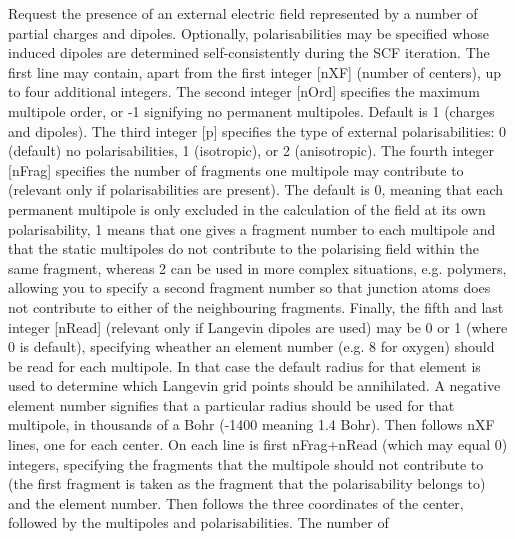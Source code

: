 \begin{keywordlist}
Request the presence of an external electric field represented by a
number of partial charges and dipoles. Optionally, polarisabilities may be specified whose
induced dipoles are determined self-consistently during the SCF iteration.
The first line may contain, apart from the first integer [nXF] (number of centers), up to
four additional integers. The second integer [nOrd] specifies the maximum multipole order,
or -1 signifying no permanent multipoles. Default is 1 (charges and dipoles). The third
integer [p] specifies the type of external polarisabilities: 0 (default) no polarisabilities,
1 (isotropic), or 2 (anisotropic). The fourth integer [nFrag] specifies the number of fragments one
multipole may contribute to (relevant only if polarisabilities are present). The default is 0,
meaning that each permanent multipole is only excluded in the calculation of the field at its own
polarisability, 1 means that one gives a fragment number to each multipole and that the static
multipoles do not contribute to the polarising field within the same fragment, whereas 2 can be
used in more complex situations, e.g. polymers, allowing you to specify a second fragment number
so that junction atoms does not contribute to either of the neighbouring fragments.
Finally, the fifth and last integer [nRead] (relevant only if Langevin dipoles are used) may
be 0 or 1 (where 0 is default), specifying wheather an element number (e.g. 8 for oxygen) should be
read for each multipole. In that case the default radius for that element is used to determine which
Langevin grid points should be annihilated. A negative element number signifies that a particular
radius should be used for that multipole, in thousands of a Bohr (-1400 meaning 1.4 Bohr).
Then follows nXF lines, one for each center. On each line is first nFrag+nRead (which may equal 0)
integers, specifying the fragments that the multipole should not contribute to (the first fragment is
taken as the fragment that the polarisability belongs to) and the element number. Then follows
the three coordinates of the center, followed by the multipoles and polarisabilities. The number of

\end{keywordlist}
